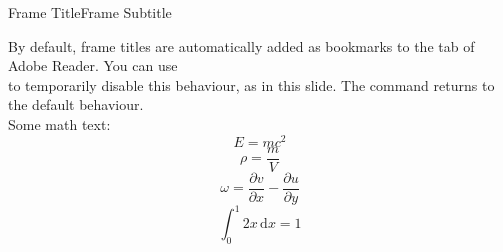 \begin{frame}{Frame Title}{Frame Subtitle}
  \autobookmark %

  By default, frame titles are automatically added as bookmarks to the  tab of Adobe Reader. You can use {\tt \string\noautobookmark}\\ to temporarily disable this behaviour, as in this slide. The command {\tt \string\autobookmark} returns to the default behaviour.\\[1ex]

  Some math text:
  \begin{equation}
    E = m c^2
  \end{equation}
  \begin{equation}
    \rho = \frac{m}{V}
  \end{equation}
  \begin{equation}
    \omega = \frac{\partial v}{\partial x} - \frac{\partial u}{\partial y}
  \end{equation}
  \begin{equation}
    \int_0^1 2x\,\mathrm{d}x = 1
  \end{equation}
\end{frame}

